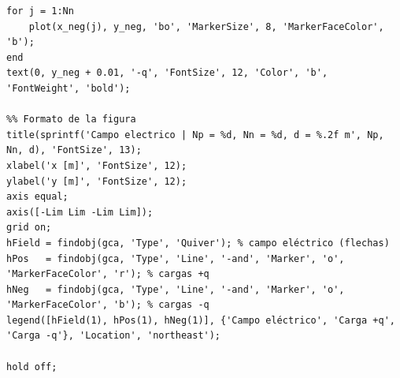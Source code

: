 \begin{lstlisting}[style=Matlab-editor]
%% Marcamos la posicion de cada carga negativa
for j = 1:Nn
    plot(x_neg(j), y_neg, 'bo', 'MarkerSize', 8, 'MarkerFaceColor', 'b');
end
text(0, y_neg + 0.01, '-q', 'FontSize', 12, 'Color', 'b', 'FontWeight', 'bold');

%% Formato de la figura
title(sprintf('Campo electrico | Np = %d, Nn = %d, d = %.2f m', Np, Nn, d), 'FontSize', 13);
xlabel('x [m]', 'FontSize', 12);
ylabel('y [m]', 'FontSize', 12);
axis equal;
axis([-Lim Lim -Lim Lim]);
grid on;
hField = findobj(gca, 'Type', 'Quiver'); % campo eléctrico (flechas)
hPos   = findobj(gca, 'Type', 'Line', '-and', 'Marker', 'o', 'MarkerFaceColor', 'r'); % cargas +q
hNeg   = findobj(gca, 'Type', 'Line', '-and', 'Marker', 'o', 'MarkerFaceColor', 'b'); % cargas -q
legend([hField(1), hPos(1), hNeg(1)], {'Campo eléctrico', 'Carga +q', 'Carga -q'}, 'Location', 'northeast');

hold off;
\end{lstlisting}